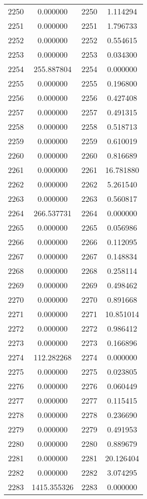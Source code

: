 \documentclass[12pt]{article}
\begin{document}
\begin{longtable}{@{}cccc@{}}
2250 & 0.000000 & 2250 & 1.114294 \\
2251 & 0.000000 & 2251 & 1.796733 \\
2252 & 0.000000 & 2252 & 0.554615 \\
2253 & 0.000000 & 2253 & 0.034300 \\
2254 & 255.887804 & 2254 & 0.000000 \\
2255 & 0.000000 & 2255 & 0.196800 \\
2256 & 0.000000 & 2256 & 0.427408 \\
2257 & 0.000000 & 2257 & 0.491315 \\
2258 & 0.000000 & 2258 & 0.518713 \\
2259 & 0.000000 & 2259 & 0.610019 \\
2260 & 0.000000 & 2260 & 0.816689 \\
2261 & 0.000000 & 2261 & 16.781880 \\
2262 & 0.000000 & 2262 & 5.261540 \\
2263 & 0.000000 & 2263 & 0.560817 \\
2264 & 266.537731 & 2264 & 0.000000 \\
2265 & 0.000000 & 2265 & 0.056986 \\
2266 & 0.000000 & 2266 & 0.112095 \\
2267 & 0.000000 & 2267 & 0.148834 \\
2268 & 0.000000 & 2268 & 0.258114 \\
2269 & 0.000000 & 2269 & 0.498462 \\
2270 & 0.000000 & 2270 & 0.891668 \\
2271 & 0.000000 & 2271 & 10.851014 \\
2272 & 0.000000 & 2272 & 0.986412 \\
2273 & 0.000000 & 2273 & 0.166896 \\
2274 & 112.282268 & 2274 & 0.000000 \\
2275 & 0.000000 & 2275 & 0.023805 \\
2276 & 0.000000 & 2276 & 0.060449 \\
2277 & 0.000000 & 2277 & 0.115415 \\
2278 & 0.000000 & 2278 & 0.236690 \\
2279 & 0.000000 & 2279 & 0.491953 \\
2280 & 0.000000 & 2280 & 0.889679 \\
2281 & 0.000000 & 2281 & 20.126404 \\
2282 & 0.000000 & 2282 & 3.074295 \\
2283 & 1415.355326 & 2283 & 0.000000 \\

\end{longtable}
\end{document}
